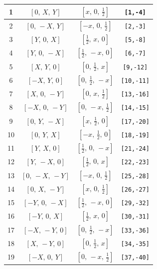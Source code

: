 \documentclass[fleqn,8pt]{jsarticle}
\begin{document}
\begin{longtable}{cccc}
1 & $\left[ 0,\, X,\, Y \right]$ & $\left[ x,\, 0,\, \frac{1}{2} \right]$ & {\tt [1,-4]} \\ \hline
2 & $\left[ 0,\, - X,\, Y \right]$ & $\left[ - x,\, 0,\, \frac{1}{2} \right]$ & {\tt [2,-3]} \\ \hline
3 & $\left[ Y,\, 0,\, X \right]$ & $\left[ \frac{1}{2},\, x,\, 0 \right]$ & {\tt [5,-8]} \\ \hline
4 & $\left[ Y,\, 0,\, - X \right]$ & $\left[ \frac{1}{2},\, - x,\, 0 \right]$ & {\tt [6,-7]} \\ \hline
5 & $\left[ X,\, Y,\, 0 \right]$ & $\left[ 0,\, \frac{1}{2},\, x \right]$ & {\tt [9,-12]} \\ \hline
6 & $\left[ - X,\, Y,\, 0 \right]$ & $\left[ 0,\, \frac{1}{2},\, - x \right]$ & {\tt [10,-11]} \\ \hline
7 & $\left[ X,\, 0,\, - Y \right]$ & $\left[ 0,\, x,\, \frac{1}{2} \right]$ & {\tt [13,-16]} \\ \hline
8 & $\left[ - X,\, 0,\, - Y \right]$ & $\left[ 0,\, - x,\, \frac{1}{2} \right]$ & {\tt [14,-15]} \\ \hline
9 & $\left[ 0,\, Y,\, - X \right]$ & $\left[ x,\, \frac{1}{2},\, 0 \right]$ & {\tt [17,-20]} \\ \hline
10 & $\left[ 0,\, Y,\, X \right]$ & $\left[ - x,\, \frac{1}{2},\, 0 \right]$ & {\tt [18,-19]} \\ \hline
11 & $\left[ Y,\, X,\, 0 \right]$ & $\left[ \frac{1}{2},\, 0,\, - x \right]$ & {\tt [21,-24]} \\ \hline
12 & $\left[ Y,\, - X,\, 0 \right]$ & $\left[ \frac{1}{2},\, 0,\, x \right]$ & {\tt [22,-23]} \\ \hline
13 & $\left[ 0,\, - X,\, - Y \right]$ & $\left[ - x,\, 0,\, \frac{1}{2} \right]$ & {\tt [25,-28]} \\ \hline
14 & $\left[ 0,\, X,\, - Y \right]$ & $\left[ x,\, 0,\, \frac{1}{2} \right]$ & {\tt [26,-27]} \\ \hline
15 & $\left[ - Y,\, 0,\, - X \right]$ & $\left[ \frac{1}{2},\, - x,\, 0 \right]$ & {\tt [29,-32]} \\ \hline
16 & $\left[ - Y,\, 0,\, X \right]$ & $\left[ \frac{1}{2},\, x,\, 0 \right]$ & {\tt [30,-31]} \\ \hline
17 & $\left[ - X,\, - Y,\, 0 \right]$ & $\left[ 0,\, \frac{1}{2},\, - x \right]$ & {\tt [33,-36]} \\ \hline
18 & $\left[ X,\, - Y,\, 0 \right]$ & $\left[ 0,\, \frac{1}{2},\, x \right]$ & {\tt [34,-35]} \\ \hline
19 & $\left[ - X,\, 0,\, Y \right]$ & $\left[ 0,\, - x,\, \frac{1}{2} \right]$ & {\tt [37,-40]} \\ \hline

\end{longtable}
\end{document}
